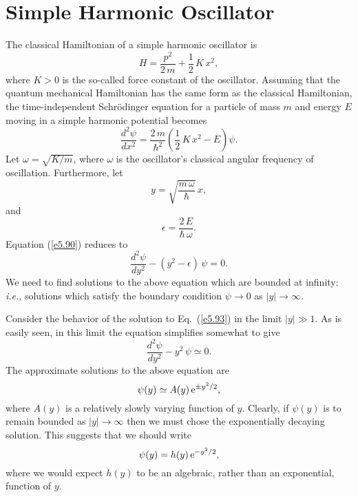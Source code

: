 \section{Simple Harmonic Oscillator}\label{sosc}
The classical Hamiltonian of a simple harmonic oscillator is
\begin{equation}
H = \frac{p^2}{2\,m} + \frac{1}{2}\,K\,x^2,
\end{equation}
where $K>0$ is the so-called force constant of the oscillator. Assuming that the quantum
mechanical Hamiltonian has the same form as the classical Hamiltonian, the time-independent Schr\"{o}dinger equation for a particle of mass $m$ and energy $E$ moving in a
simple harmonic potential becomes
\begin{equation}\label{e5.90}
\frac{d^2\psi}{dx^2}  =  \frac{2\,m}{\hbar^2}\left(\frac{1}{2}\,K\,x^2-E\right)\psi.
\end{equation}
Let $\omega = \sqrt{K/m}$, where $\omega$ is the oscillator's classical angular frequency of oscillation. Furthermore, let
\begin{equation}
y = \sqrt{\frac{m\,\omega}{\hbar}}\,x,
\end{equation}
and
\begin{equation}\label{e5.92}
\epsilon = \frac{2\,E}{\hbar\,\omega}.
\end{equation}
Equation (\ref{e5.90}) reduces to
\begin{equation}\label{e5.93}
\frac{d^2\psi}{dy^2} - (y^2-\epsilon)\,\psi = 0.
\end{equation}
We need to find solutions to the above equation which are bounded
at infinity: {\em i.e.},  solutions which satisfy the boundary
condition $\psi\rightarrow 0$ as $|y|\rightarrow\infty$.

Consider the behavior of the solution to Eq.~(\ref{e5.93}) in the limit $|y|\gg 1$. As is easily seen, in this limit the equation simplifies somewhat to give
\begin{equation}
\frac{d^2\psi}{dy^2} - y^2\,\psi \simeq  0.
\end{equation}
The approximate solutions to the above equation are
\begin{equation}
\psi(y) \simeq A(y)\,{\rm e}^{\pm y^2/2},
\end{equation}
where $A(y)$ is a relatively slowly varying function of $y$.
Clearly, if $\psi(y)$ is to remain bounded as $|y|\rightarrow\infty$ then we
must chose the exponentially decaying solution. This suggests that
we should write
\begin{equation}\label{e5.96}
\psi(y) = h(y)\,{\rm e}^{-y^2/2},
\end{equation} 
where we would expect $h(y)$ to be an algebraic, rather than an exponential, function of $y$.

